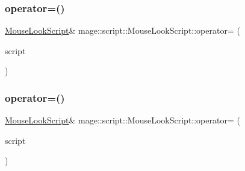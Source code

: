 \subsubsection{\texorpdfstring{operator=()}{operator=()}\hspace{0.1cm}{\footnotesize\ttfamily [1/2]}}
{\footnotesize\ttfamily \hyperlink{classmage_1_1script_1_1_mouse_look_script}{Mouse\+Look\+Script}\& mage\+::script\+::\+Mouse\+Look\+Script\+::operator= (\begin{DoxyParamCaption}\item[{const \hyperlink{classmage_1_1script_1_1_mouse_look_script}{Mouse\+Look\+Script} \&}]{script }\end{DoxyParamCaption})\hspace{0.3cm}{\ttfamily [delete]}}

\hypertarget{classmage_1_1script_1_1_mouse_look_script_a019b949f86d066507ea74a9db126137e}{}\label{classmage_1_1script_1_1_mouse_look_script_a019b949f86d066507ea74a9db126137e} 
\subsubsection{\texorpdfstring{operator=()}{operator=()}\hspace{0.1cm}{\footnotesize\ttfamily [2/2]}}
{\footnotesize\ttfamily \hyperlink{classmage_1_1script_1_1_mouse_look_script}{Mouse\+Look\+Script}\& mage\+::script\+::\+Mouse\+Look\+Script\+::operator= (\begin{DoxyParamCaption}\item[{\hyperlink{classmage_1_1script_1_1_mouse_look_script}{Mouse\+Look\+Script} \&\&}]{script }\end{DoxyParamCaption})\hspace{0.3cm}{\ttfamily [delete]}}

\hypertarget{classmage_1_1script_1_1_mouse_look_script_a50c3ddaad18713509394d168cddc8aa8}{}\label{classmage_1_1script_1_1_mouse_look_script_a50c3ddaad18713509394d168cddc8aa8} 

